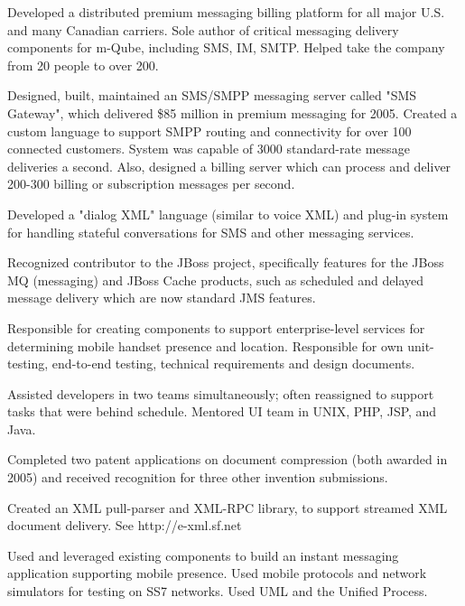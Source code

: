 \documentclass{article}
\begin{document}
  
Developed a distributed premium messaging billing platform for all major U.S.
and many Canadian carriers. Sole author of critical messaging delivery
components for m-Qube, including SMS, IM, SMTP. Helped take the company from
20 people to over 200.
\begin{items}
\item Designed, built, maintained an SMS/SMPP messaging server called "SMS
Gateway", which delivered \$85 million in premium messaging for 2005.  Created
a custom language to support SMPP routing and connectivity for over 100
connected customers.  System was capable of 3000 standard-rate message
deliveries a second.  Also, designed a billing server which can process and
deliver 200-300 billing or subscription messages per second.
\item Developed a "dialog XML" language (similar to voice XML) and plug-in
system for handling stateful conversations for SMS and other messaging services.
\item Recognized contributor to the JBoss project, specifically features for
the JBoss MQ (messaging) and JBoss Cache products, such as scheduled and
delayed message delivery which are now standard JMS features.
\end{items}

  

Responsible for creating components to support enterprise-level services
for determining mobile handset presence and location. Responsible for own
unit-testing, end-to-end testing, technical requirements and design
documents.
\begin{items}
\item Assisted developers in two teams simultaneously; often reassigned
to support tasks that were behind schedule.  Mentored UI team in
UNIX, PHP, JSP, and Java.
\item Completed two patent applications on document compression (both awarded
in 2005) and received recognition for three other invention submissions.
\item Created an XML pull-parser and XML-RPC library, to support streamed
XML document delivery.  See http://e-xml.sf.net
\end{items}

Used and leveraged existing components to build an instant messaging
application supporting mobile presence. Used mobile protocols and network
simulators for testing on SS7 networks.  Used UML and the Unified Process.
\end{document}
